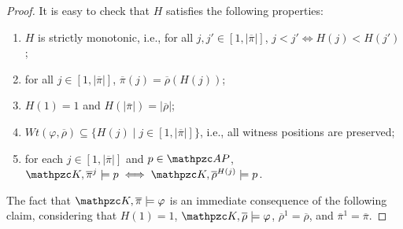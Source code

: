 \begin{proof}
It is easy to check that $H$ satisfies the following properties:
\begin{enumerate}
  \item $H$ is strictly monotonic, i.e., for all $j,j'\in [1,|\overline{\pi}|]$, $j<j'\iff H(j)<H(j')$;
  \item for all $j\in [1,|\overline{\pi}|]$, $\overline{\pi}(j)=\overline{\rho}(H(j))$;
  \item $H(1)= 1$ and $H(|\overline{\pi}|)=|\overline{\rho}|$;
  \item $Wt(\varphi,\overline{\rho})\subseteq \{H(j) \mid j \in [1,|\overline{\pi}|] \}$, i.e., all witness positions are preserved;
  \item for each $j\in [1,|\overline{\pi}|]$ and $p\in \Prop$, $\Ku,\overline{\pi}^{j}\models p\iff \Ku,\overline{\rho}^{H(j)}\models p$.
\end{enumerate}

The fact that
$\Ku,\overline{\pi}\models \varphi$ is an immediate consequence of the following claim, considering that  $H(1)=1$, $\Ku,\overline{\rho}\models \varphi$,  $\overline{\rho}^{1}=\overline{\rho}$, and $\overline{\pi}^{1}=\overline{\pi}$.


\end{proof}
